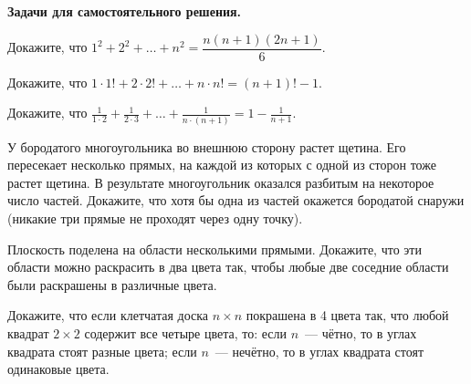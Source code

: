 

{\bf Задачи для самостоятельного решения.}


\begin{problems}
\item
Докажите, что $1^2 + 2^2 + \ldots + n^2 = \dfrac{n(n+1)(2n+1)}{6}.$


\item
Докажите, что $1 \cdot 1! + 2 \cdot 2! + \ldots + n \cdot n! = (n+1)! - 1.$


\item
Докажите, что $\frac{1}{1 \cdot 2} + \frac{1}{2 \cdot 3} + \ldots + \frac{1}{n \cdot (n+1)} = 1 - \frac{1}{n+1}.$




\item
У бородатого многоугольника во внешнюю сторону растет щетина. Его
пересекает несколько прямых, на каждой из которых с одной из сторон
тоже растет щетина. В результате многоугольник оказался разбитым на
некоторое число частей. Докажите, что хотя бы одна из частей
окажется бородатой снаружи (никакие три прямые не проходят через
одну точку).

\item
Плоскость поделена на области несколькими прямыми. Докажите, что эти
области можно раскрасить в два цвета так, чтобы любые две соседние
области были раскрашены в различные цвета.






\item
Докажите, что если клетчатая доска $n \times n$ покрашена в 4 цвета
так, что любой квадрат $2 \times 2$ содержит все четыре цвета, то:
если $n$~--- чётно, то в углах квадрата стоят разные цвета; если $n$~---
нечётно, то в углах квадрата стоят одинаковые цвета.


\end{problems}

